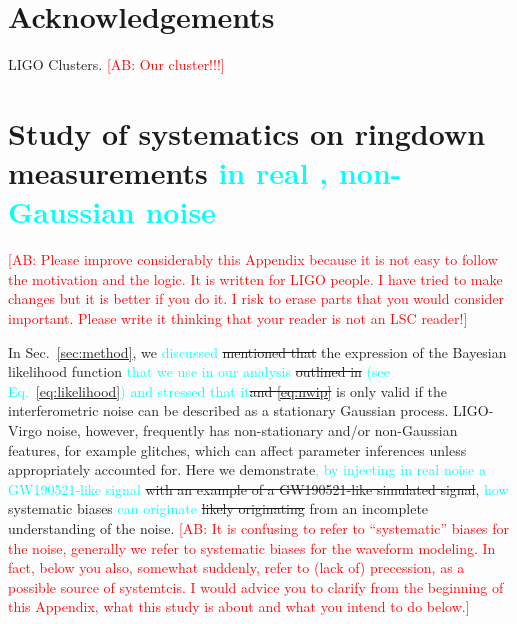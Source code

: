 \documentclass[twocolumn,prd,aps,superscriptaddress,preprintnumbers,tightenlines,showpacs,nofootinbib,eqsecnum,amsfonts,amsmath]{revtex4-1}
\newcommand{\ab}[1]{\textcolor{cyan}{#1}}
\newcommand{\comment}[1]{\textcolor{red}{[#1]}}
\begin{document}
\section*{Acknowledgements}
\label{sec:acknowledgements}
LIGO Clusters. \comment{AB: Our cluster!!!}


\appendix

\section{Study of systematics on ringdown measurements \ab{in real , non-Gaussian noise}}\label{sec:noise_systematics}

\comment{AB: Please improve considerably this Appendix because it is not easy to follow the motivation and the logic. It is written for LIGO people. 
I have tried to make changes but it is better if you do it. I risk to erase parts that you would consider important. Please write it thinking that your 
reader is not an LSC reader!}

In Sec.~\ref{sec:method}, we \ab{discussed} \sout{mentioned that} the expression of the
Bayesian likelihood function \ab{that we use in our analysis} \sout{outlined in} \ab{(see 
Eq.~\ref{eq:likelihood})} \ab{and stressed that it}\sout{and \ref{eq:nwip}} is only valid if the interferometric noise can be
described as a stationary Gaussian process. LIGO-Virgo noise, however,
frequently has non-stationary and/or non-Gaussian features, for
example glitches, which can affect parameter inferences unless
appropriately accounted for. Here we demonstrate\ab{, by injecting in real 
noise a GW190521-like signal} \sout{with an example of a
GW190521-like simulated signal}, \ab{how} systematic biases \ab{can originate} \sout{likely originating}
from an incomplete understanding of the noise. \comment{AB: It is confusing to refer to ``systematic'' 
biases for the noise, generally we refer to systematic biases for the waveform modeling. 
In fact, below you also, somewhat suddenly, refer to (lack of) precession, as a possible source of systemtcis. 
I would advice you to clarify from the beginning of this Appendix, what this study is about and what you intend to 
do below.}
\end{document}
